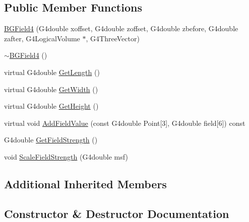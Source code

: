 \subsection*{Public Member Functions}
\begin{DoxyCompactItemize}
\item 
\hyperlink{classBGField4_a616373e8c0c863aa7dba3eca5071a4fe}{B\+G\+Field4} (G4double xoffset, G4double zoffset, G4double zbefore, G4double zafter, G4\+Logical\+Volume $\ast$, G4\+Three\+Vector)
\item 
\hyperlink{classBGField4_a27bd8cf3f0b85067974a6646c0e72fa8}{$\sim$\+B\+G\+Field4} ()
\item 
virtual G4double \hyperlink{classBGField4_a96982694a0653d70dc49c0bddc9a1a0c}{Get\+Length} ()
\item 
virtual G4double \hyperlink{classBGField4_a4fc6f543ddaf430f26df8d0d7687da02}{Get\+Width} ()
\item 
virtual G4double \hyperlink{classBGField4_aaef21e47c9eb04de54c54eaaa447ddaa}{Get\+Height} ()
\item 
virtual void \hyperlink{classBGField4_a5fb7b43392be3ccf8851be3d5cef6906}{Add\+Field\+Value} (const G4double Point\mbox{[}3\mbox{]}, G4double field\mbox{[}6\mbox{]}) const 
\item 
G4double \hyperlink{classBGField4_a1a691325351535cc7130278a3478c482}{Get\+Field\+Strength} ()
\item 
void \hyperlink{classBGField4_a511d43c534dd4646f5662bf1f2e103b6}{Scale\+Field\+Strength} (G4double msf)
\end{DoxyCompactItemize}
\subsection*{Additional Inherited Members}


\subsection{Constructor \& Destructor Documentation}
